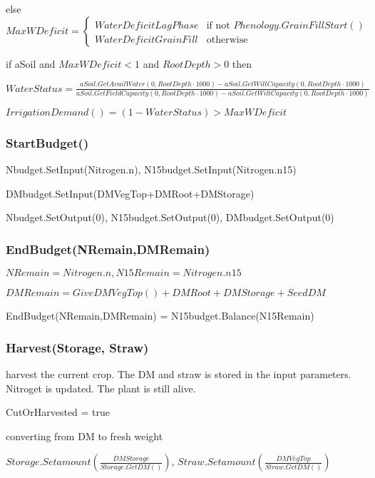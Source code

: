 \documentclass[%
]{scrartcl}
\newcommand\mymarginpar[1]{\marginpar {\flushleft\bfseries\scriptsize #1}}
\begin{document}
\quad else $MaxWDeficit = 
         	\begin{cases}
         	WaterDeficitLagPhase & \text{if not } Phenology.GrainFillStart()  \\       
         	WaterDeficitGrainFill & \text{otherwise}
       	\end{cases} 
       	$ 
   
\quad   if aSoil and $MaxWDeficit<1$ and $RootDepth>0$ then
  
\quad\quad   	$WaterStatus= 
   	\tfrac{aSoil.GetAvailWater(0,RootDepth  \cdot  1000)-aSoil.GetWiltCapacity(0,RootDepth  \cdot  1000)}
   	{aSoil.GetFieldCapacity(0,RootDepth  \cdot  1000)-aSoil.GetWiltCapacity(0,RootDepth  \cdot  1000)}
     $   
      
$IrrigationDemand() = (1-WaterStatus) > MaxWDeficit  $

  
\subsubsection*{StartBudget()}
	Nbudget.SetInput(Nitrogen.n), N15budget.SetInput(Nitrogen.n15)
	
  DMbudget.SetInput(DMVegTop+DMRoot+DMStorage)
  
  Nbudget.SetOutput(0), N15budget.SetOutput(0), DMbudget.SetOutput(0)


\subsubsection*{EndBudget(NRemain,DMRemain)}
 $NRemain=Nitrogen.n,  N15Remain = Nitrogen.n15$

$DMRemain=GiveDMVegTop()+DMRoot + DMStorage+SeedDM$ 

EndBudget(NRemain,DMRemain) = N15budget.Balance(N15Remain)


   
   
\subsubsection*{Harvest(Storage, Straw)} 
\mymarginpar{fracNminInVegTop}
harvest the current crop. The DM and straw 
is stored in the input parameters. Nitroget is updated. 
The plant is still alive.

   CutOrHarvested = true 
      
     converting from DM to fresh weight
	  
  $Storage.Setamount\left(\tfrac{DMStorage}{Storage.GetDM()}\right)$,   $Straw.Setamount\left(\tfrac{DMVegTop}{Straw.GetDM()}\right) $
  
\end{document}
